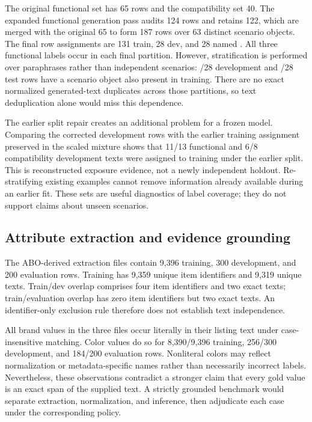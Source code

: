 The original functional set has 65 rows and the compatibility set 40. The expanded functional generation pass audits 124 rows and retains 122, which are merged with the original 65 to form 187 rows over 63 distinct scenario objects. The final row assignments are 131 train, 28 dev, and 28 named . All three functional labels occur in each final partition. However, stratification is performed over paraphrases rather than independent scenarios: \ScenarioDevSeen{}/28 development and \ScenarioTestSeen{}/28 test rows have a scenario object also present in training. There are no exact normalized generated-text duplicates across those partitions, so text deduplication alone would miss this dependence.

The earlier split repair creates an additional problem for a frozen model. Comparing the corrected development rows with the earlier training assignment preserved in the scaled mixture shows that 11/13 functional and 6/8 compatibility development texts were assigned to training under the earlier split. This is reconstructed exposure evidence, not a newly independent holdout. Re-stratifying existing examples cannot remove information already available during an earlier fit. These sets are useful diagnostics of label coverage; they do not support claims about unseen scenarios.

\subsection{Attribute extraction and evidence grounding}
The ABO-derived extraction files contain 9,396 training, 300 development, and 200 evaluation rows. Training has 9,359 unique item identifiers and 9,319 unique texts. Train/dev overlap comprises four item identifiers and two exact texts; train/evaluation overlap has zero item identifiers but two exact texts. An identifier-only exclusion rule therefore does not establish text independence.

All brand values in the three files occur literally in their listing text under case-insensitive matching. Color values do so for 8,390/9,396 training, 256/300 development, and 184/200 evaluation rows. Nonliteral colors may reflect normalization or metadata-specific names rather than necessarily incorrect labels. Nevertheless, these observations contradict a stronger claim that every gold value is an exact span of the supplied text. A strictly grounded benchmark would separate extraction, normalization, and inference, then adjudicate each case under the corresponding policy.

